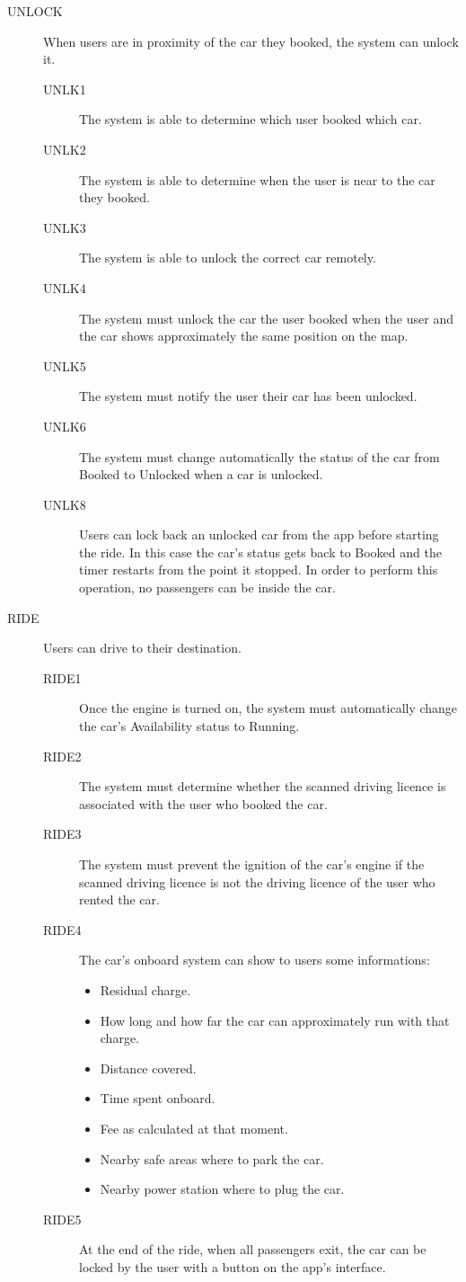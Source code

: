 \documentclass[11pt]{article} %
\begin{document}
\begin{description}
 	\item[UNLOCK] When users are in proximity of the car they booked, the system can unlock it.
	\begin{description}
	\item[UNLK1] The system is able to determine which user booked which car.
	\item[UNLK2] The system is able to determine when the user is near to the car they booked.
	\item[UNLK3] The system is able to unlock the correct car remotely.
	\item[UNLK4] The system must unlock the car the user booked when the user and the car shows approximately the same position on the map.
	\item[UNLK5] The system must notify the user their car has been unlocked.
	\item[UNLK6] The system must change automatically the status of the car from Booked to Unlocked when a car is unlocked.
	\item[UNLK8] Users can lock back an unlocked car from the app before starting the ride. In this case the car's status gets back to Booked and the timer restarts from the point it stopped. In order to perform this operation, no passengers can be inside the car.
	\end{description}

	\item[RIDE] Users can drive to their destination.
	\begin{description}
	\item[RIDE1] Once the engine is turned on, the system must automatically change the car's Availability status to Running.
	\item[RIDE2] The system must determine whether the scanned driving licence is associated with the user who booked the car.
	\item[RIDE3] The system must prevent the ignition of the car's engine if the scanned driving licence is not the driving licence of the user who rented the car.
	\item[RIDE4] The car's onboard system can show to users some informations:
	\begin{itemize}
		\item Residual charge.
		\item How long and how far the car can approximately run with that charge.
		\item Distance covered.
		\item Time spent onboard.
		\item Fee as calculated at that moment.
		\item Nearby safe areas where to park the car.
		\item Nearby power station where to plug the car.
	\end{itemize}
	\item[RIDE5] At the end of the ride, when all passengers exit, the car can be locked by the user with a button on the app's interface.
 	\end{description}


\end{description}
\end{document}
